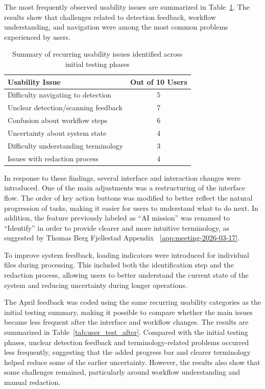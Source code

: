 The most frequently observed usability issues are summarized in Table~\ref{tab:user_test_summary}. The results show that challenges related to detection feedback, workflow understanding, and navigation were among the most common problems experienced by users.

\begin{table}[h]
\centering
\begin{tabular}{lc}
\hline
\textbf{Usability Issue} & \textbf{Out of 10 Users} \\
\hline
Difficulty navigating to detection & 5 \\
Unclear detection/scanning feedback & 7 \\
Confusion about workflow steps & 6 \\
Uncertainty about system state & 4 \\
Difficulty understanding terminology & 3 \\
Issues with redaction process & 4 \\
\hline
\end{tabular}
\caption{Summary of recurring usability issues identified across initial testing phases}
\label{tab:user_test_summary}
\end{table}

In response to these findings, several interface and interaction changes were introduced. One of the main adjustments was a restructuring of the interface flow. The order of key action buttons was modified to better reflect the natural progression of tasks, making it easier for users to understand what to do next. In addition, the feature previously labeled as ``AI mission'' was renamed to ``Identify'' in order to provide clearer and more intuitive terminology, as suggested by Thomas Berg Fjellestad Appendix ~\ref{app:meeting-2026-03-17}.

To improve system feedback, loading indicators were introduced for individual files during processing. This included both the identification step and the redaction process, allowing users to better understand the current state of the system and reducing uncertainty during longer operations.

The April feedback was coded using the same recurring usability categories as the initial testing summary, making it possible to compare whether the main issues became less frequent after the interface and workflow changes. The results are summarized in Table~\ref{tab:user_test_after}. Compared with the initial testing phases, unclear detection feedback and terminology-related problems occurred less frequently, suggesting that the added progress bar and clearer terminology helped reduce some of the earlier uncertainty. However, the results also show that some challenges remained, particularly around workflow understanding and manual redaction.

